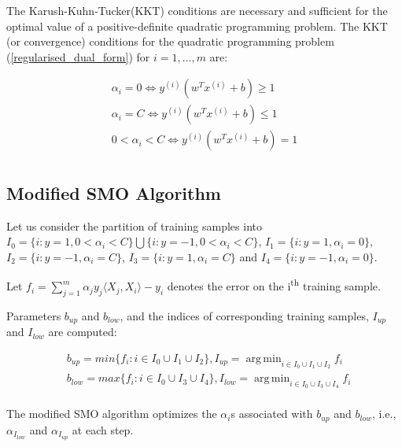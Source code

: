 \documentclass{article}
\DeclareMathOperator*{\argmin}{arg\,min}
\begin{document}
		The Karush-Kuhn-Tucker(KKT) conditions are necessary and sufficient for the optimal value of a positive-definite quadratic programming problem. The KKT (or convergence) conditions for the quadratic programming problem (\ref{regularised_dual_form}) for $i=1, \ldots, m$ are:
		
		\begin{equation}
			\label{kkt_conditions}
			\begin{aligned}
				\alpha_i = 0 \iff y^{(i)} (w^T x^{(i)} + b) \geq 1 \\
				\alpha_i = C \iff y^{(i)} (w^T x^{(i)} + b) \leq 1 \\
				0 < \alpha_i < C \iff y^{(i)} (w^T x^{(i)} + b) = 1 \\
			\end{aligned}
		\end{equation}

	\subsection{Modified SMO Algorithm}
			
		Let us consider the partition of training samples into $I_0 = \{i: y=1, 0 < \alpha_i < C\} \bigcup \{i: y=-1, 0 < \alpha_i < C\}$, $I_1 = \{i: y=1, \alpha_i = 0\}$, $I_2 = \{i: y=-1, \alpha_i = C\}$, $I_3 = \{i: y=1, \alpha_i = C\}$ and $I_4 = \{i: y=-1, \alpha_i = 0\}$.
	
		Let $f_i = \sum_{j=1}^{m} \alpha_j y_j \langle X_j, X_i \rangle - y_i$ denotes the error on the i\textsuperscript{th} training sample.
	
		Parameters $b_{up}$ and $b_{low}$, and the indices of corresponding training samples, $I_{up}$ and $I_{low}$ are computed:
	
		\begin{equation*}
			\begin{aligned}
				&	b_{up} = min \{ f_i : i \in I_0 \cup I_1 \cup I_2 \}, I_{up} = \argmin_{i \in I_0 \cup I_1 \cup I_2} f_i \\
				&	b_{low} = max \{ f_i : i \in I_0 \cup I_3 \cup I_4\}, I_{low} = \argmin_{i \in I_0 \cup I_3 \cup I_4} f_i \\
			\end{aligned}
		\end{equation*}
	
		The modified SMO algorithm optimizes the $\alpha_i$s associated with $b_{up}$ and $b_{low}$, i.e., $\alpha_{I_{low}}$ and $\alpha_{I_{up}}$ at each step.
	
\end{document}
